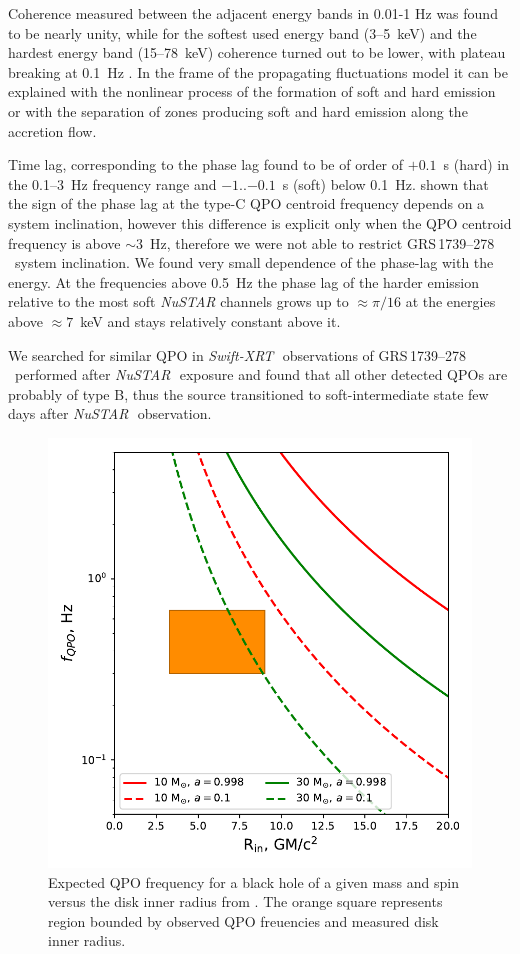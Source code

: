 \documentclass[a4paper,fleqn,usenatbib]{mnras}
\def\grs{{GRS\,1739--278\,}}
\def\swiftx{{\em Swift-XRT\,}}
\def\nustar{{\em NuSTAR\,}}
\begin{document}
Coherence measured between the adjacent energy bands in 0.01-1 Hz was found to be nearly unity, while for the softest used energy band (3--5~keV) and the hardest energy band (15--78~keV) coherence turned out to be lower, with plateau breaking at 0.1~Hz . 
In the frame of the propagating fluctuations model it can be explained with the nonlinear process of the formation of soft and hard emission or with the separation of zones producing soft and hard emission along the accretion flow.

Time lag, corresponding to the phase lag found to be of order of $+0.1$~s (hard) in the 0.1--3~Hz frequency range and $-1$..$-0.1$~s (soft) below 0.1~Hz.
\citet{2017MNRAS.464.2643V} shown that the sign of the phase lag at the type-C QPO centroid frequency depends on a system inclination, however this difference is explicit only when the QPO centroid frequency is above $\sim3$~Hz, therefore we were not able to restrict \grs\ system inclination.
We found very small dependence of the phase-lag with the energy.
At the frequencies above 0.5~Hz the phase lag of the harder emission relative to the most soft {\it NuSTAR} channels grows up to $\approx \pi/16$ at the energies above $\approx7$~keV and stays relatively constant above it.

We searched for similar QPO in \swiftx\ observations of \grs\ performed after \nustar\, exposure and found that all other detected QPOs are probably of type B, thus the source transitioned to soft-intermediate state few days after \nustar\ observation.


\begin{figure}
        \includegraphics[width=\columnwidth]{qpoconstr_v04.pdf}
        \caption{Expected QPO frequency for a black hole of a given mass and spin versus the disk inner radius from \protect\cite{ingram14}. The orange square represents region bounded by observed QPO freuencies and measured disk inner radius.}
        \label{fig:qpoconstr}
\end{figure}
\end{document}
